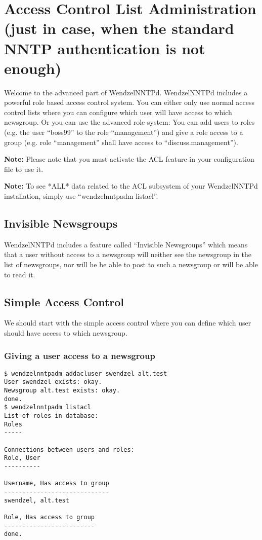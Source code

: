 \section{Access Control List Administration (just in case, when the standard NNTP authentication is not enough)}

Welcome to the advanced part of WendzelNNTPd. WendzelNNTPd includes a powerful role based access control system. You can either only use normal access control lists where you can configure which user will have access to which newsgroup. Or you can use the advanced role system: You can add users to roles (e.g. the user ``boss99'' to the role ``management'') and give a role access to a group (e.g. role ``management'' shall have access to ``discuss.management'').

{\bf Note:} Please note that you must activate the ACL feature in your configuration file to use it.

{\bf Note:} To see *ALL* data related to the ACL subsystem of your WendzelNNTPd installation, simply use ``wendzelnntpadm listacl''.

\subsection{Invisible Newsgroups}

WendzelNNTPd includes a feature called ``Invisible Newsgroups'' which means that a user without access to a newsgroup will neither see the newsgroup in the list of newsgroups, nor will he be able to post to such a newsgroup or will be able to read it.

\subsection{Simple Access Control}

We should start with the simple access control where you can define which user should have access to which newsgroup.

\subsubsection{Giving a user access to a newsgroup}

\begin{verbatim}
$ wendzelnntpadm addacluser swendzel alt.test
User swendzel exists: okay.
Newsgroup alt.test exists: okay.
done.
$ wendzelnntpadm listacl
List of roles in database:
Roles
-----

Connections between users and roles:
Role, User
----------

Username, Has access to group
-----------------------------
swendzel, alt.test

Role, Has access to group
-------------------------
done.
\end{verbatim}

